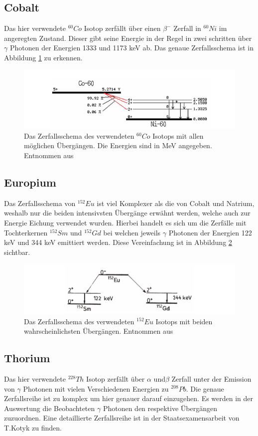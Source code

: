 \subsection{Cobalt}
Das hier verwendete $^{60}Co$ Isotop zerfällt über einen $\beta^-$ Zerfall in $^{60}Ni$ im angeregten Zustand. Dieser gibt seine Energie in der Regel in zwei schritten über $\gamma$ Photonen der Energien 1333 und 1173 keV ab. Das genaue Zerfallsschema ist in Abbildung \ref{Cobalt_schema} zu erkennen.
\begin{figure}
	\centering
	\includegraphics[scale=0.8]{Bilder/Cobalt_zerfall}
	\caption[Zerfallsschema Cobalt]{\small Das Zerfallsschema des verwendeten $^{60}Co$ Isotops mit allen möglichen Übergängen. Die Energien sind in MeV angegeben. Entnommen aus \cite{staatsex_szinti}}
	\label{Cobalt_schema}
\end{figure}

\subsection{Europium}
Das Zerfallsschema von $^{152}Eu$ ist viel Komplexer als die von Cobalt und Natrium, weshalb nur die beiden intensivsten Übergänge erwähnt werden, welche auch zur Energie Eichung verwendet wurden. Hierbei handelt es sich um die Zerfälle mit Tochterkernen $^{152}Sm$ und  $^{152}Gd$ bei welchen jeweils $\gamma$ Photonen der Energien 122 keV und 344 keV emittiert werden. Diese Vereinfachung ist in Abbildung \ref{Europium_schema}   sichtbar.
\begin{figure}
	\centering
	\includegraphics[scale=0.8]{Bilder/Europium_zerfall}
	\caption[Zerfallsschema Europium]{\small Das Zerfallsschema des verwendeten $^{152}Eu$ Isotops mit beiden wahrscheinlichsten Übergängen. Entnommen aus \cite{staatsex_szinti}}
	\label{Europium_schema}
\end{figure}

\subsection{Thorium}
Das hier verwendete $^{228}Th$ Isotop zerfällt über $\alpha$ und$\beta$ Zerfall unter der Emission von $\gamma$ Photonen mit  vielen Verschiedenen Energien zu $^{208}Pb$. Die genaue Zerfallsreihe ist zu komplex um hier genauer darauf einzugehen. Es werden in der Auswertung die Beobachteten $\gamma$ Photonen den respektive Übergängen zuzuordnen. Eine detaillierte Zerfallsreihe ist in der Staatsexamensarbeit von T.Kotyk \cite{staatsex_szinti} zu finden.